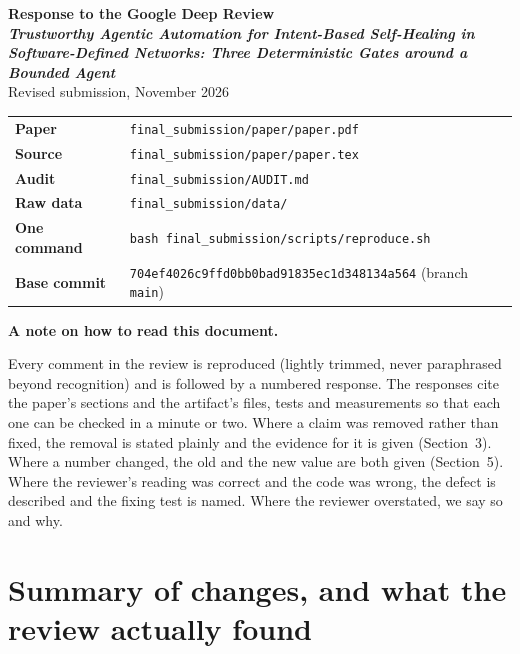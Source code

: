\documentclass[11pt,a4paper]{article}
\begin{document}
\begin{titlepage}
\vspace*{2.8cm}
{\color{ink}\Huge\bfseries Response to the Google Deep Review\\\bigskip}
{\color{ink}\large\bfseries
\emph{Trustworthy Agentic Automation for Intent-Based Self-Healing in
Software-Defined Networks: Three Deterministic Gates around a Bounded Agent}\\[0.6em]}
{\large Revised submission, November 2026}

\vspace{1.2cm}
\begin{tabular}{@{}ll@{}}
\toprule
\textbf{Paper} & \texttt{final\_submission/paper/paper.pdf} \\
\textbf{Source} & \texttt{final\_submission/paper/paper.tex} \\
\textbf{Audit} & \texttt{final\_submission/AUDIT.md} \\
\textbf{Raw data} & \texttt{final\_submission/data/} \\
\textbf{One command} & \texttt{bash final\_submission/scripts/reproduce.sh} \\
\textbf{Base commit} & \texttt{704ef4026c9ffd0bb0bad91835ec1d348134a564} (branch \texttt{main}) \\
\bottomrule
\end{tabular}

\vspace{1.5cm}
\noindent\textbf{A note on how to read this document.}

Every comment in the review is reproduced (lightly trimmed, never paraphrased
beyond recognition) and is followed by a numbered response. The responses cite
the paper's sections and the artifact's files, tests and measurements so that
each one can be checked in a minute or two. Where a claim was removed rather
than fixed, the removal is stated plainly and the evidence for it is given
(Section~3). Where a number changed, the old and the new value are both given
(Section~5). Where the reviewer's reading was correct and the code was wrong,
the defect is described and the fixing test is named. Where the reviewer
overstated, we say so and why.

\vfill
\end{titlepage}

\section{Summary of changes, and what the review actually found}
\end{document}
